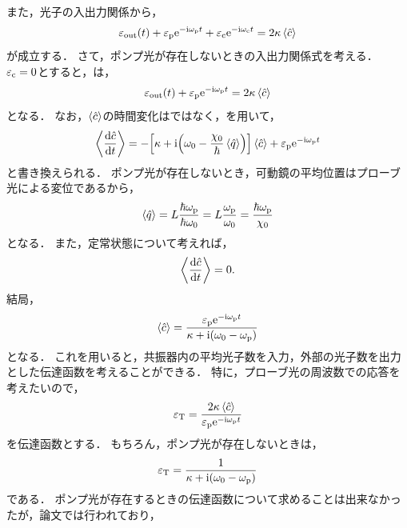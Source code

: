 \documentclass{report}
\begin{document}
      また，光子の入出力関係から，
      \begin{align}
        \epsilon_{\r{out}}(t) + \epsilon_{\r{p}}\e^{-\i\omega_{\r{p}}t} + \epsilon_{\r{c}}\e^{-\i\omega_{\r{c}}t} = 2\kappa\ev{\hat{c}} \label{PhysRevA.81.041803-io-relation}
      \end{align}
      が成立する．
      さて，ポンプ光が存在しないときの入出力関係式を考える．
      $\varepsilon_{\mathrm{c}} = 0$とすると，は，
      \begin{align}
        \epsilon_{\r{out}}(t) + \epsilon_{\r{p}}\e^{-\i\omega_{\r{p}}t} = 2\kappa\ev{\hat{c}}
      \end{align}
      となる．
      なお，$\ev{\hat{c}}$の時間変化はではなく，を用いて，
      \begin{align}
        \ev{\dv{\hat{c}}{t}} = -\qty[\kappa + \i\qty(\omega_0 - \frac{\chi_0}{\hbar}\ev{\hat{q}})]\ev{\hat{c}} + \epsilon_{\r{p}}\e^{-\i\omega_{\r{p}}t}
      \end{align}
      と書き換えられる．
      ポンプ光が存在しないとき，可動鏡の平均位置はプローブ光による変位であるから，
      \begin{align}
        \ev{\hat{q}} = L\frac{\hbar\omega_{\r{p}}}{\hbar\omega_0} = L\frac{\omega_{\r{p}}}{\omega_0} = \frac{\hbar\omega_{\r{p}}}{\chi_0}
      \end{align}
      となる．
      また，定常状態について考えれば，
      \begin{align}
        \ev{\dv{\hat{c}}{t}} = 0.
      \end{align}
      結局，
      \begin{align}
        \ev{\hat{c}} = \frac{\epsilon_{\r{p}}\e^{-\i\omega_{\r{p}}t}}{\kappa + \i\qty(\omega_0 - \omega_{\r{p}})}
      \end{align}
      となる．
      これを用いると，共振器内の平均光子数を入力，外部の光子数を出力とした伝達函数を考えることができる．
      特に，プローブ光の周波数での応答を考えたいので，
      \begin{align}
        \epsilon_{\r{T}} = \frac{2\kappa\ev{\hat{c}}}{\epsilon_{\r{p}}\e^{-\i\omega_{\r{p}}t}}
      \end{align}
      を伝達函数とする．
      もちろん，ポンプ光が存在しないときは，
      \begin{align}
        \varepsilon_{\mathrm{T}} = \frac{1}{\kappa + \mathrm{i}\qty(\omega_0 - \omega_{\mathrm{p}})}
      \end{align}
      である．
      ポンプ光が存在するときの伝達函数について求めることは出来なかったが，論文では行われており，
\end{document}

